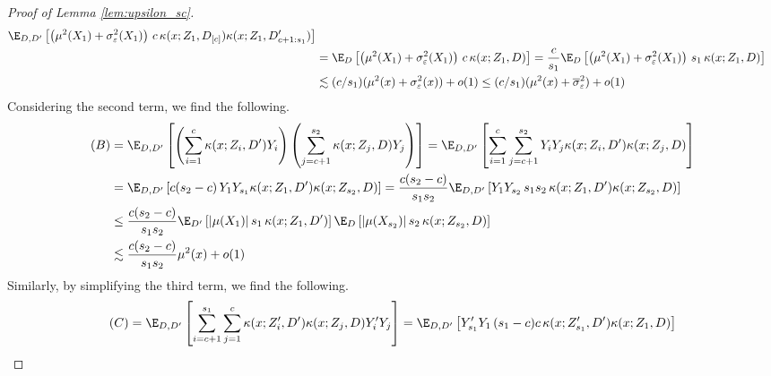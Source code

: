 \begin{proof}[Proof of Lemma \ref{lem:upsilon_sc}]
\begin{equation}
\begin{aligned}
			\E_{D, D^{\prime}}\left[\left(\mu^2(X_{1}) + \sigma^2_{\varepsilon}(X_{1})\right) \, c \, \kappa(x; Z_1, D_{[c]})\kappa(x; Z_1, D^{\prime}_{c+1:s_1})\right] \\
			 & = \E_{D}\left[\left(\mu^2(X_{1}) + \sigma^2_{\varepsilon}(X_{1})\right) \, c \, \kappa(x; Z_1, D)\right]
			= \frac{c}{s_1} \E_{D}\left[\left(\mu^2(X_{1}) + \sigma^2_{\varepsilon}(X_{1})\right) \, s_1 \, \kappa(x; Z_1, D)\right]                                               \\
			 & \lesssim (c/s_1)(\mu^2(x) + \sigma^2_{\varepsilon}(x)) + o(1)
			\leq (c/s_1)(\mu^2(x) + \overline{\sigma}^2_{\varepsilon}) + o(1)
		\end{aligned}
	\end{equation}
	Considering the second term, we find the following.
	\begin{equation}
		\begin{aligned}
			(B)
			 & = \E_{D, D^{\prime}}\left[\left(\sum_{i = 1}^{c}\kappa(x; Z_{i}, D^{\prime}) Y_{i}\right)\left(\sum_{j = c+1}^{s_2} \kappa(x; Z_j, D) Y_j\right)\right]
			= \E_{D, D^{\prime}}\left[\sum_{i = 1}^{c}\sum_{j = c+1}^{s_2}Y_{i} Y_j \kappa(x; Z_{i}, D^{\prime})\kappa(x; Z_j, D)\right]                               \\
			 & = \E_{D, D^{\prime}}\left[c(s_2 - c) \, Y_1 Y_{s_1} \kappa(x; Z_1, D^{\prime})\kappa(x; Z_{s_2}, D)\right]
			= \frac{c (s_2 - c)}{s_1 s_2}\E_{D, D^{\prime}}\left[Y_1 Y_{s_2} \, s_1 s_2 \,\kappa(x; Z_1, D^{\prime})\kappa(x; Z_{s_2}, D)\right]                   \\
			 & \leq \frac{c (s_2 - c)}{s_1 s_2}
			\E_{D^{\prime}}\left[|\mu(X_1)| \, s_1  \,\kappa(x; Z_1, D^{\prime})\right]
			\E_{D}\left[|\mu(X_{s_2})| \, s_2  \,\kappa(x; Z_{s_2}, D)\right]                                                                                       \\
			 & \lesssim \frac{c(s_2 - c)}{s_1 s_2} \mu^2(x) + o(1)
		\end{aligned}
	\end{equation}
	Similarly, by simplifying the third term, we find the following.
	\begin{equation}
		\begin{aligned}
			(C)
			 & = \E_{D, D^{\prime}}\left[\sum_{i = c+1}^{s_1}\sum_{j = 1}^{c} \kappa(x; Z_{i}^{\prime}, D^{\prime})\kappa(x; Z_j, D)Y_{i}^{\prime} Y_j\right]
			= \E_{D, D^{\prime}}\left[Y_{s_1}^{\prime} Y_{1} \, (s_1 - c)c \, \kappa(x; Z_{s_1}^{\prime}, D^{\prime})\kappa(x; Z_1, D)\right]                                                    \\

\end{aligned}
\end{equation}
\end{proof}
